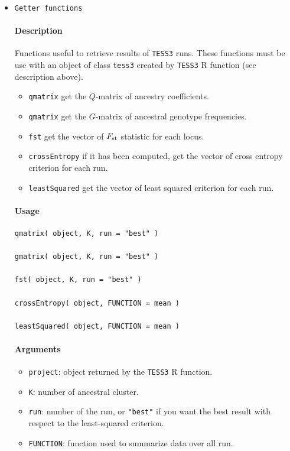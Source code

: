 \documentclass[10pt,a4paper]{article}
\begin{document}
\begin{itemize}
\item \verb|Getter functions|

\paragraph{Description}
Functions useful to retrieve results of {\tt TESS3} runs. These functions must be use with an object of class \verb|tess3| created by \verb|TESS3| R function (see description above).

\begin{itemize}
  \item[] \verb|qmatrix| get the $Q$-matrix of ancestry coefficients.
  \item[] \verb|qmatrix| get the $G$-matrix of ancestral genotype frequencies.
  \item[] \verb|fst| get the vector of $F_{\rm st}$ statistic for each locus.
  \item[] \verb|crossEntropy| if it has been computed, get the vector of cross entropy criterion for each run.
  \item[] \verb|leastSquared| get the vector of least squared criterion for each run.
\end{itemize}


\paragraph{Usage}
\begin{Verbatim}
qmatrix( object, K, run = "best" )
 
gmatrix( object, K, run = "best" )
  
fst( object, K, run = "best" )
  
crossEntropy( object, FUNCTION = mean ) 

leastSquared( object, FUNCTION = mean )

\end{Verbatim}
\paragraph{Arguments}
\begin{itemize}
\item \verb|project|: object returned by the \verb|TESS3| R function.
\item \verb|K|: number of ancestral cluster.
\item \verb|run|: number of the run, or \verb|"best"| if you want the best result with respect to the least-squared criterion.
\item \verb|FUNCTION|: function used to summarize data over all run.


\end{itemize}
\end{itemize}
\end{document}
